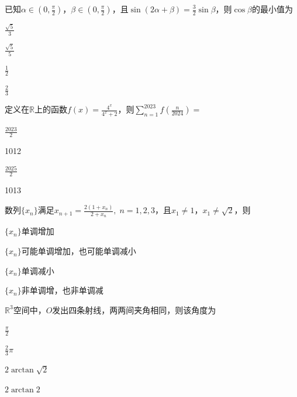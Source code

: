 \documentclass{exam-zh}
\begin{document}
\begin{question}
  已知$\alpha\in\left(0,\frac\pi2\right)$，$\beta\in\left(0,\frac\pi2\right)$，且$\sin\left(2\alpha+\beta\right)=\frac32\sin\beta$，则$\cos\beta$的最小值为 \paren

  \begin{choices}
    \item $\frac{\sqrt 5}3$
    \item $\frac{\sqrt 5}5$
    \item $\frac12$
    \item $\frac23$
  \end{choices}
\end{question}

\begin{question}
  定义在$\mathbb R$上的函数$f(x)=\frac{4^x}{4^x+2}$，则$\sum_{n=1}^{2023}f\left(\frac{n}{2024}\right)=$ \paren

  \begin{choices}
    \item $\frac{2023}2$
    \item 1012
    \item $\frac{2025}2$
    \item 1013
  \end{choices}
\end{question}

\begin{question}
  数列$\{x_n\}$满足$x_{n+1}=\frac{2(1+x_n)}{2+x_n},\;n=1,2,3$，且$x_1\neq1$，$x_1\neq\sqrt2$，则 \paren

  \begin{choices}
    \item $\{x_n\}$单调增加
    \item $\{x_n\}$可能单调增加，也可能单调减小
    \item $\{x_n\}$单调减小
    \item $\{x_n\}$非单调增，也非单调减
  \end{choices}
\end{question}

\begin{question}
  $\mathbb R^3$空间中，$O$发出四条射线，两两间夹角相同，则该角度为 \paren

  \begin{choices}
    \item $\frac\pi2$
    \item $\frac23\pi$
    \item $2\arctan\sqrt2$
    \item $2\arctan2$
  \end{choices}
\end{question}
\end{document}

